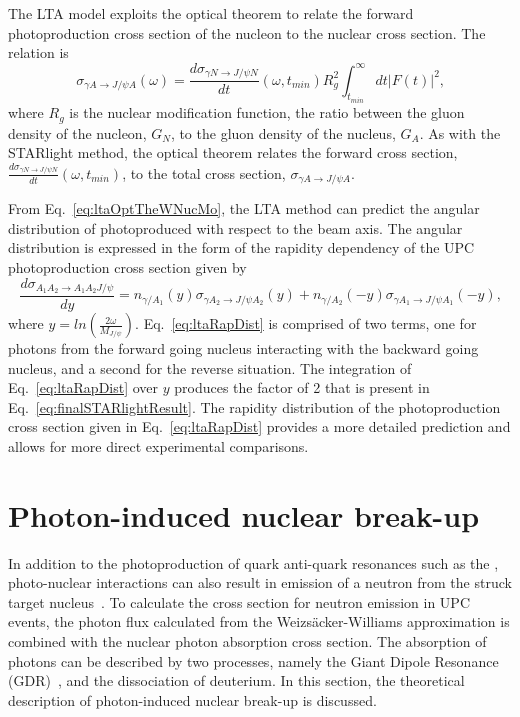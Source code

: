    The LTA model exploits the optical theorem to relate the forward 
     photoproduction cross section of the nucleon to the nuclear cross section. 
   The relation is
   \begin{equation} \label{eq:ltaOptTheWNucMo}
     \sigma_{\gamma A\rightarrow J/\psi A}(\omega)=
     \frac{d\sigma_{\gamma N\rightarrow J/\psi N}}{dt}(\omega,t_{min})
     R_{g}^{2}\int_{t_{min}}^{\infty}dt|F(t)|^{2}\textrm{,}
   \end{equation}
   where $R_{g}$ is the nuclear modification function, the ratio between the gluon 
     density of the nucleon, $G_{N}$, to the gluon density of the nucleus, 
     $G_{A}$.
   As with the STARlight method, the optical theorem relates the forward cross 
     section, $\frac{d\sigma_{\gamma N\rightarrow J/\psi N}}{dt}(\omega,t_{min})$,
     to the total cross section, $\sigma_{\gamma A\rightarrow J/\psi A}$. 

   From Eq.~\ref{eq:ltaOptTheWNucMo}, the LTA method can predict the angular 
     distribution of photoproduced \JPsi{} with respect to the beam axis. 
   The angular distribution is expressed in the form of the rapidity 
    dependency of the UPC photoproduction cross section given by 
   \begin{equation} \label{eq:ltaRapDist}
     \frac{d\sigma_{A_{1}A_{2}\rightarrow A_{1}A_{2}J/\psi}}{dy}=
       n_{\gamma/A_{1}}(y)\sigma_{\gamma A_{2}\rightarrow J/\psi A_{2}}(y)
       +n_{\gamma/A_{2}}(-y)\sigma_{\gamma A_{1}\rightarrow J/\psi A_{1}}(-y)\textrm{,} 
   \end{equation}
   where $y=ln\left(\frac{2\omega}{M_{J/\psi}}\right)$.
   Eq.~\ref{eq:ltaRapDist} is comprised of two terms, one for photons from the
     forward going nucleus interacting with the backward going nucleus, and 
     a second for the reverse situation. 
   The integration of Eq.~\ref{eq:ltaRapDist} over $y$ produces the factor of 2 
     that is present in Eq.~\ref{eq:finalSTARlightResult}.
   The rapidity distribution of the photoproduction cross section given in 
   Eq.~\ref{eq:ltaRapDist} provides a more detailed prediction and allows for
     more direct experimental comparisons.

  \section{\label{sec:nucBreakUp}Photon-induced nuclear break-up}
    In addition to the photoproduction of quark anti-quark resonances such as 
      the \JPsi{}, photo-nuclear interactions can also result in emission of a 
      neutron from the struck target nucleus~\cite{Strikman:2005ze,Guzey:2013jaa}.
    To calculate the cross section for neutron emission in UPC events, the 
      photon flux calculated from the Weizs\"{a}cker-Williams approximation is
      combined with the nuclear photon absorption cross section. 
    The absorption of photons can be described by two processes, namely the 
      Giant Dipole Resonance (GDR)~\cite{Emling:1994gu,dePassos:2001dc}, and the dissociation of deuterium.
    In this section, the theoretical description of photon-induced nuclear 
      break-up is discussed.


